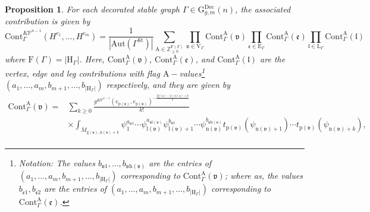 \documentclass[12pt]{amsart}
\newtheorem{prop}{Proposition}[section]
\numberwithin{equation}{section}
\newcommand{\KP}{K\mathbb{P}}
\begin{document}
\begin{prop}\label{prop:contributions}
For each decorated stable graph $\Gamma\in\mathrm{G}_{g,m}^{\text{Dec}}(n)$, the associated contribution is given by
\begin{equation*}
\mathrm{Cont}^{\KP^{n-1}}_{\Gamma}\left(H^{c_{1}}, \ldots, H^{c_{m}}\right)=\frac{1}{|\mathrm{Aut}(\Gamma^{\mathrm{St}})|} \sum_{\mathrm{A} \in \mathbb{Z}_{\geq 0}^{\mathrm{F}(\Gamma)}} \prod_{\mathfrak{v} \in \mathrm{V}_{\Gamma}} \mathrm{Cont}_{\Gamma}^{\mathrm{A}}(\mathfrak{v}) \prod_{\mathfrak{e}\in \mathrm{E}_{\Gamma}} \mathrm{Cont}_{\Gamma}^{\mathrm{A}}(\mathfrak{e}) \prod_{\mathfrak{l} \in \mathrm{L}_{\Gamma}} \mathrm{Cont}_{\Gamma}^{\mathrm{A}}(\mathfrak{l})
\end{equation*}
where $\mathrm{F}(\Gamma)=\left\vert\mathrm{H}_{\Gamma}\right\vert$. Here, $\mathrm{Cont}_{\Gamma}^{\mathrm{A}}(\mathfrak{v})$, $\mathrm{Cont}_{\Gamma}^{\mathrm{A}}(\mathfrak{e})$, and $\mathrm{Cont}_{\Gamma}^{\mathrm{A}}(\mathfrak{l})$ are the {\em vertex}, {\em edge} and {\em leg} contributions with flag $\mathrm{A}-$values\footnote{Notation: The values ${b_{\mathfrak{v}1}},\ldots,{b_{\mathfrak{v}\mathrm{h}(\mathfrak{v})}}$ are the entries of $(a_1,\ldots,a_m,b_{m+1},\ldots,b_{\left\vert\mathrm{H}_{\Gamma}\right\vert})$ corresponding to $\mathrm{Cont}_{\Gamma}^{\mathrm{A}}(\mathfrak{v})$; where as, the values $b_{\mathfrak{e}1},b_{\mathfrak{e}2}$ are the entries of $(a_1,\ldots,a_m,b_{m+1},\ldots,b_{\left\vert\mathrm{H}_{\Gamma}\right\vert})$ corresponding to $\mathrm{Cont}_{\Gamma}^{\mathrm{A}}(\mathfrak{e})$.} $(a_1,\ldots,a_m,b_{m+1},\ldots,b_{\left\vert\mathrm{H}_{\Gamma}\right\vert})$ respectively, and they are given by
\begin{equation*}
\begin{split}
    \mathrm{Cont}_{\Gamma}^{\mathrm{A}}(\mathfrak{v})
    =&\sum_{k \geq 0} \frac{g^{\KP^{n-1}}({e}_{\mathrm{p}(\mathfrak{v})},{e}_{\mathrm{p}(\mathfrak{v})})^{-\frac{2\mathrm{g}(\mathfrak{v})-2+\mathrm{n}(\mathfrak{v})+k}{2}}}{k !}\\
    &\times\int_{\overline{M}_{\mathrm{g}(\mathfrak{v}),\mathrm{n}(\mathfrak{v})+k}}\psi_1^{a_{\mathfrak{v}1}}\cdots\psi_{\mathrm{l}(\mathfrak{v})}^{a_{\mathfrak{v}\mathrm{l}(\mathfrak{v})}}\psi_{\mathrm{l}(\mathfrak{v})+1}^{b_{\mathfrak{v}1}}\cdots\psi_{\mathrm{n}(\mathfrak{v})}^{b_{\mathfrak{v}\mathrm{h}(\mathfrak{v})}}t_{\mathrm{p}(\mathfrak{v})}(\psi_{\mathrm{n}(\mathfrak{v})+1})\cdots t_{\mathrm{p}(\mathfrak{v})}(\psi_{\mathrm{n}(\mathfrak{v})+k}),\\

\end{split}
\end{equation*}
\end{prop}
\end{document}

